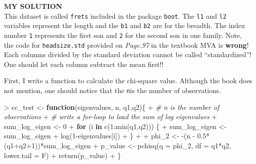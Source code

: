 \documentclass[
]{article}
\newenvironment{Shaded}{\begin{snugshade}}{\end{snugshade}}
\newcommand{\AttributeTok}[1]{\textcolor[rgb]{0.77,0.63,0.00}{#1}}
\newcommand{\CommentTok}[1]{\textcolor[rgb]{0.56,0.35,0.01}{\textit{#1}}}
\newcommand{\ControlFlowTok}[1]{\textcolor[rgb]{0.13,0.29,0.53}{\textbf{#1}}}
\newcommand{\DecValTok}[1]{\textcolor[rgb]{0.00,0.00,0.81}{#1}}
\newcommand{\FloatTok}[1]{\textcolor[rgb]{0.00,0.00,0.81}{#1}}
\newcommand{\FunctionTok}[1]{\textcolor[rgb]{0.00,0.00,0.00}{#1}}
\newcommand{\NormalTok}[1]{#1}
\newcommand{\OtherTok}[1]{\textcolor[rgb]{0.56,0.35,0.01}{#1}}
\newcommand{\SpecialCharTok}[1]{\textcolor[rgb]{0.00,0.00,0.00}{#1}}
\begin{document}
\textbf{MY SOLUTION}\\
This dataset is called \texttt{frets} included in the package
\texttt{boot}. The \texttt{l1} and \texttt{l2} variables represent the
length and the \texttt{b1} and \texttt{b2} are for the breadth. The
index number \texttt{1} represents the first son and \texttt{2} for the
second son in one family. Note, the code for \texttt{headsize.std}
provided on \emph{Page.97} in the textbook MVA is \textbf{wrong}! Each
columns divided by the standard deviation cannot be called
``standardized''! One should let each column subtract the mean first!!

First, I write a function to calculate the chi-square value. Although
the book does not mention, one should notice that the \texttt{n}is the
number of observations.

\begin{Shaded}
\begin{Highlighting}[]
\SpecialCharTok{\textgreater{}}\NormalTok{ cc\_test }\OtherTok{\textless{}{-}} \ControlFlowTok{function}\NormalTok{(eigenvalues, n, q1,q2)\{}
\SpecialCharTok{+}   \CommentTok{\# n is the number of observations}
\SpecialCharTok{+}   \CommentTok{\# write a for{-}loop to load the sum of log eigenvalues}
\SpecialCharTok{+}\NormalTok{   sum\_log\_eigen }\OtherTok{\textless{}{-}} \DecValTok{0}
\SpecialCharTok{+}   \ControlFlowTok{for}\NormalTok{ (i }\ControlFlowTok{in} \FunctionTok{c}\NormalTok{(}\DecValTok{1}\SpecialCharTok{:}\FunctionTok{min}\NormalTok{(q1,q2))) \{}
\SpecialCharTok{+}\NormalTok{     sum\_log\_eigen }\OtherTok{\textless{}{-}}\NormalTok{ sum\_log\_eigen }\SpecialCharTok{+} \FunctionTok{log}\NormalTok{(}\DecValTok{1}\SpecialCharTok{{-}}\NormalTok{eigenvalues[i])}
\SpecialCharTok{+}\NormalTok{   \}}
\SpecialCharTok{+} 
\SpecialCharTok{+}\NormalTok{   phi\_2 }\OtherTok{\textless{}{-}} \SpecialCharTok{{-}}\NormalTok{(n }\SpecialCharTok{{-}} \FloatTok{0.5}\SpecialCharTok{*}\NormalTok{(q1}\SpecialCharTok{+}\NormalTok{q2}\SpecialCharTok{+}\DecValTok{1}\NormalTok{))}\SpecialCharTok{*}\NormalTok{sum\_log\_eigen}
\SpecialCharTok{+}\NormalTok{   p\_value }\OtherTok{\textless{}{-}} \FunctionTok{pchisq}\NormalTok{(}\AttributeTok{q =}\NormalTok{ phi\_2, }\AttributeTok{df =}\NormalTok{ q1}\SpecialCharTok{*}\NormalTok{q2, }\AttributeTok{lower.tail =}\NormalTok{ F)}
\SpecialCharTok{+}   \FunctionTok{return}\NormalTok{(p\_value)}
\SpecialCharTok{+}\NormalTok{ \}}
\end{Highlighting}
\end{Shaded}
\end{document}

